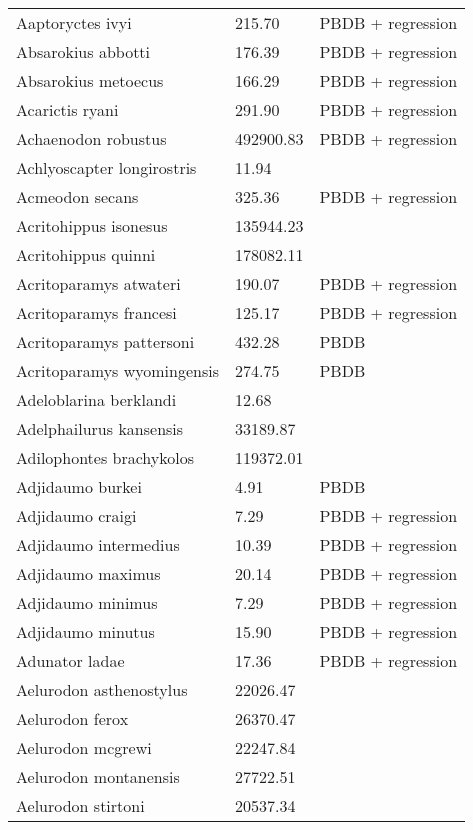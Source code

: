 \begin{center}
\begin{longtable}{p{} p{} p{} }
    \hline \hline
    \endlastfoot
Aaptoryctes ivyi & 215.70 & PBDB + regression \\ 
  Absarokius abbotti & 176.39 & PBDB + regression \\ 
  Absarokius metoecus & 166.29 & PBDB + regression \\ 
  Acarictis ryani & 291.90 & PBDB + regression \\ 
  Achaenodon robustus & 492900.83 & PBDB + regression \\ 
  Achlyoscapter longirostris & 11.94 & \cite{Tomiya2013} \\ 
  Acmeodon secans & 325.36 & PBDB + regression \\ 
  Acritohippus isonesus & 135944.23 & \cite{Tomiya2013} \\ 
  Acritohippus quinni & 178082.11 & \cite{Tomiya2013} \\ 
  Acritoparamys atwateri & 190.07 & PBDB + regression \\ 
  Acritoparamys francesi & 125.17 & PBDB + regression \\ 
  Acritoparamys pattersoni & 432.28 & PBDB \\ 
  Acritoparamys wyomingensis & 274.75 & PBDB \\ 
  Adeloblarina berklandi & 12.68 & \cite{Tomiya2013} \\ 
  Adelphailurus kansensis & 33189.87 & \cite{Tomiya2013} \\ 
  Adilophontes brachykolos & 119372.01 & \cite{Tomiya2013} \\ 
  Adjidaumo burkei & 4.91 & PBDB \\ 
  Adjidaumo craigi & 7.29 & PBDB + regression \\ 
  Adjidaumo intermedius & 10.39 & PBDB + regression \\ 
  Adjidaumo maximus & 20.14 & PBDB + regression \\ 
  Adjidaumo minimus & 7.29 & PBDB + regression \\ 
  Adjidaumo minutus & 15.90 & PBDB + regression \\ 
  Adunator ladae & 17.36 & PBDB + regression \\ 
  Aelurodon asthenostylus & 22026.47 & \cite{Tomiya2013} \\ 
  Aelurodon ferox & 26370.47 & \cite{Tomiya2013} \\ 
  Aelurodon mcgrewi & 22247.84 & \cite{Tomiya2013} \\ 
  Aelurodon montanensis & 27722.51 & \cite{Tomiya2013} \\ 
  Aelurodon stirtoni & 20537.34 & \cite{Tomiya2013} \\ 

\end{longtable}
\end{center}
